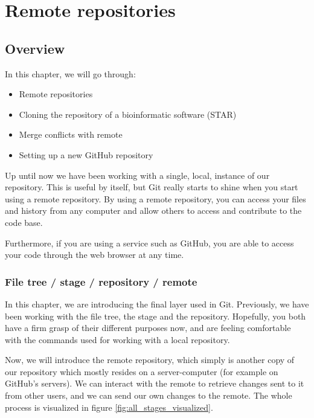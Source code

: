 \documentclass[../main/git_course_main.tex]{subfiles}
\begin{document}
	
	\setcounter{chapter}{4}
	\chapter{Remote repositories}
	
	
	\section{Overview}
	
	In this chapter, we will go through:
	
	\begin{itemize}
		\item Remote repositories
		\item Cloning the repository of a bioinformatic software (STAR)
		\item Merge conflicts with remote
		\item Setting up a new GitHub repository
	\end{itemize}
	
	Up until now we have been working with a single, local, instance of our
	repository. This is useful by itself, but Git really starts to shine
	when you start using a remote repository. By using a remote repository, you can access
	your files and history from any computer and allow others to access and contribute to the code base.
	
	Furthermore, if you are using a service such as GitHub, you are able to access your code through the web browser at any time.
	
	\subsection{File tree / stage / repository / remote}
	
	In this chapter, we are introducing the final layer used in Git.
	Previously, we have been working with the file tree, the stage and the repository.
	Hopefully, you both have a firm grasp of their different purposes now, and are feeling comfortable with the commands used for working with a local repository.
	
	Now, we will introduce the remote repository, which simply is another copy of our
	repository which mostly resides on a server-computer (for example on GitHub's servers).
	We can interact with the remote to retrieve changes sent to it from other users,
	and we can send our own changes to the remote. The whole process is visualized in figure \ref{fig:all_stages_visualized}.
	
\end{document}
